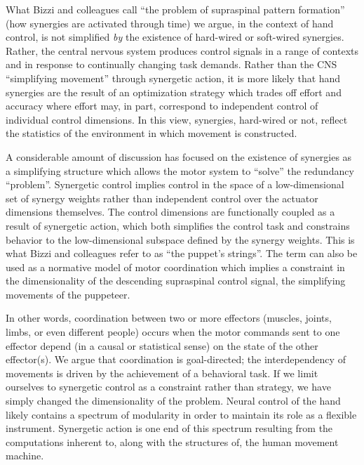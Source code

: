 \documentclass[../main.tex]{subfiles}
\begin{document}
What Bizzi and colleagues call ``the problem of supraspinal pattern formation'' (how synergies are activated through time) we argue, in the context of hand control, is not simplified \textit{by} the existence of hard-wired or soft-wired synergies\cite{bizziMotorPlanningExecution2020}. Rather, the central nervous system produces control signals in a range of contexts and in response to continually changing task demands. Rather than the CNS ``simplifying movement'' through synergetic action, it is more likely that hand synergies are the result of an optimization strategy which trades off effort and accuracy where effort may, in part, correspond to independent control of individual control dimensions. In this view, synergies, hard-wired or not, reflect the statistics of the environment in which movement is constructed\cite{brutonSynergiesCoordinationComprehensive2018}.

A considerable amount of discussion has focused on the existence of synergies as a simplifying structure which allows the motor system to ``solve'' the redundancy ``problem''. Synergetic control implies control in the space of a low-dimensional set of synergy weights rather than independent control over the actuator dimensions themselves. The control dimensions are functionally coupled as a result of synergetic action, which both simplifies the control task and constrains behavior to the low-dimensional subspace defined by the synergy weights\cite{merelHierarchicalMotorControl2019}. This is what Bizzi and colleagues refer to as ``the puppet's strings''. The term can also be used as a normative model of motor coordination which implies a constraint in the dimensionality of the descending supraspinal control signal, the simplifying movements of the puppeteer.

In other words, coordination between two or more effectors (muscles, joints, limbs, or even different people) occurs when the motor commands sent to one effector depend (in a causal or statistical sense) on the state of the other effector(s). We argue that coordination is goal-directed; the interdependency of movements is driven by the achievement of a behavioral task. If we limit ourselves to synergetic control as a constraint rather than strategy, we have simply changed the dimensionality of the problem. Neural control of the hand likely contains a spectrum of modularity in order to maintain its role as a flexible instrument. Synergetic action is one end of this spectrum resulting from the computations inherent to, along with the structures of, the human movement machine.
\end{document}

